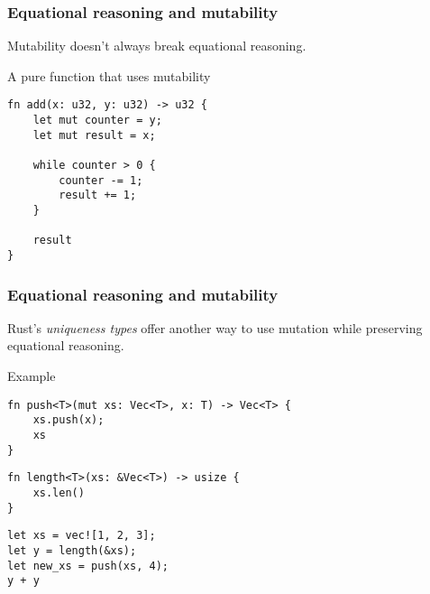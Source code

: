 \documentclass[t]{beamer}
\begin{document}
\begin{frame}[fragile]
\frametitle{Equational reasoning and mutability}

Mutability doesn't always break equational reasoning.

\begin{block}{A pure function that uses mutability}
\begin{verbatim}
fn add(x: u32, y: u32) -> u32 {
    let mut counter = y;
    let mut result = x;
    
    while counter > 0 {
        counter -= 1;
        result += 1;
    }
    
    result
}
\end{verbatim}
\end{block}

\end{frame}


\begin{frame}[fragile]
\frametitle{Equational reasoning and mutability}
Rust's \emph{uniqueness types} offer another way to use mutation while
preserving equational reasoning.

\begin{block}{Example}
\begin{verbatim}
fn push<T>(mut xs: Vec<T>, x: T) -> Vec<T> {
    xs.push(x);
    xs
}
\end{verbatim}

\begin{verbatim}
fn length<T>(xs: &Vec<T>) -> usize {
    xs.len()
}
\end{verbatim}

\begin{verbatim}
let xs = vec![1, 2, 3];
let y = length(&xs);
let new_xs = push(xs, 4);
y + y
\end{verbatim}
\end{block}

\end{frame}
\end{document}
